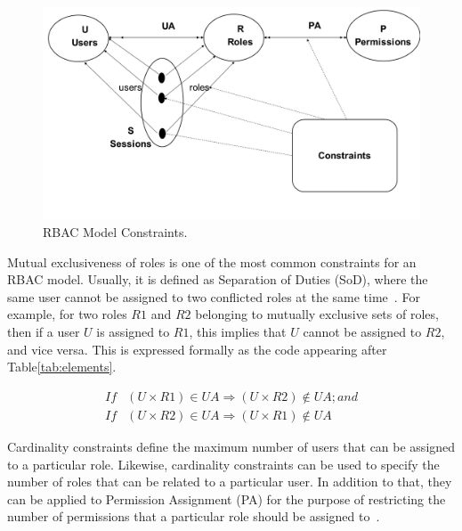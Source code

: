 \begin{figure}[bht]
\centering
\includegraphics[scale=0.26]{modelConstraints.png}
\caption{RBAC Model Constraints.}
\label{fig:RBACPol}
\end{figure}

Mutual exclusiveness of roles is one of the most common constraints for an RBAC model.  Usually, it is defined as Separation of Duties (SoD), where the same user cannot be assigned to two conflicted roles at the same time~\cite{FeKu2009}.  For example, for two roles $R1$ and $R2$ belonging to mutually exclusive sets of roles, then if a user $U$ is assigned to $R1$, this implies that $U$ cannot be assigned to $R2$, and vice versa.  This is expressed formally as the code appearing after Table\ref{tab:elements}.
  
 
\begin{align*} 
If&  (U \times R1) \in UA \Rightarrow  (U \times R2) \notin UA ;     and \\
If&  (U \times R2) \in UA \Rightarrow (U \times R1) \notin UA
\end{align*}    


Cardinality constraints define the maximum number of users that can be assigned to a particular role.  Likewise, cardinality constraints can be used to specify the number of roles that can be related to a particular user.  In addition to that, they can be applied to Permission Assignment (PA) for the purpose of restricting the number of permissions that a particular role should be assigned to~\cite{SDAG2008}.



